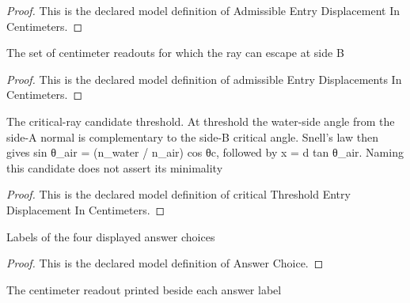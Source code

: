 \begin{proof}
  This is the declared model definition of Admissible Entry Displacement In Centimeters.
\end{proof}
\begin{definition}
  \label{def:physics:phyx-mini-0072:phyxminiproblems-problemphyxmini0072-admissibleentrydisplacementsincentimeters}
  The set of centimeter readouts for which the ray can escape at side B
\end{definition}
\begin{proof}
  This is the declared model definition of admissible Entry Displacements In Centimeters.
\end{proof}
\begin{definition}
  \label{def:physics:phyx-mini-0072:phyxminiproblems-problemphyxmini0072-criticalthresholdentrydisplacementincentimeters}
  The critical-ray candidate threshold. At threshold the water-side angle from the side-A normal is complementary to the side-B critical angle. Snell's law then gives sin θ\_air = (n\_water / n\_air) cos θc, followed by x = d tan θ\_air. Naming this candidate does not assert its minimality
\end{definition}
\begin{proof}
  This is the declared model definition of critical Threshold Entry Displacement In Centimeters.
\end{proof}
\begin{definition}
  \label{def:physics:phyx-mini-0072:phyxminiproblems-problemphyxmini0072-answerchoice}
  Labels of the four displayed answer choices
\end{definition}
\begin{proof}
  This is the declared model definition of Answer Choice.
\end{proof}
\begin{definition}
  \label{def:physics:phyx-mini-0072:phyxminiproblems-problemphyxmini0072-answerentrydisplacementincentimeters}
  The centimeter readout printed beside each answer label
\end{definition}
